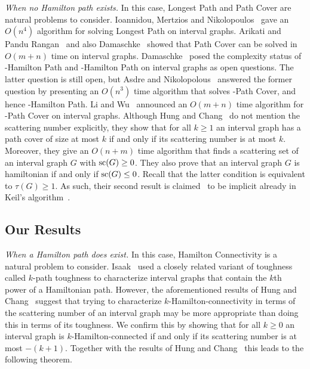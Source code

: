 \documentclass{llncs}
\DeclareMathOperator{\scat}{{\rm sc}}
\begin{document}
\medskip
\noindent
{\it When no Hamilton path exists.}
In this case, {\sc Longest Path} and {\sc Path Cover} are natural problems to consider.
Ioannidou, Mertzios and Nikolopoulos~\cite{IMN11} gave an $O(n^4)$ algorithm for solving {\sc Longest Path} on interval graphs.
Arikati and Pandu Rangan~\cite{AP90} and also Damaschke~\cite{Da93}
showed that {\sc Path Cover} can be solved in $O(m+n)$ time on interval graphs. 
Damaschke~\cite{Da93}  
posed the complexity status of {-Hamilton Path} and {-Hamilton Path} on interval graphs as open questions. 
The latter question is still open, but Asdre and Nikolopolous~\cite{AN10} answered the former 
question  by presenting an $O(n^3)$ time algorithm that solves {-Path Cover}, and hence {-Hamilton Path}.
Li and Wu~\cite{LW} announced an $O(m+n)$ time algorithm for {-Path Cover} on interval graphs.
Although Hung and Chang~\cite{HC11} do not mention the scattering number explicitly, they show that for all $k\geq 1$
an interval graph has a path cover of size at most $k$ if and only if its scattering number is at 
most $k$. Moreover, they give an $O(n+m)$ time algorithm that finds a scattering set of an interval graph $G$ with $\scat(G)\geq 0$.
They also prove that an interval graph $G$ is hamiltonian if and only if $\scat(G)\leq 0$. Recall that the latter condition is equivalent to $\tau(G)\geq 1$. 
As such, their second result is claimed~\cite{CJKL98,KKS07} to be implicit already in Keil's algorithm~\cite{Ke85}.


  \subsection{Our Results}\label{s-ours}
 
 {\it When a Hamilton path does exist.} 
 In this case, {\sc Hamilton Connectivity} is a natural problem to consider.
 Isaak~\cite{Is98} used a closely related variant of toughness called $k$-path toughness to characterize interval graphs that contain the $k$th power of a Hamiltonian path. However, the aforementioned results of Hung and Chang~\cite{HC11} suggest that trying to characterize $k$-Hamilton-connectivity in terms
 of the scattering number of an interval graph may be more appropriate than doing this in terms of its toughness. We confirm this by showing that for all $k\geq 0$ an interval graph is $k$-Hamilton-connected if and only if its scattering number is at most $-(k+1)$. Together with the results of Hung and Chang~\cite{HC11} this leads to the following theorem.
  
\end{document}
